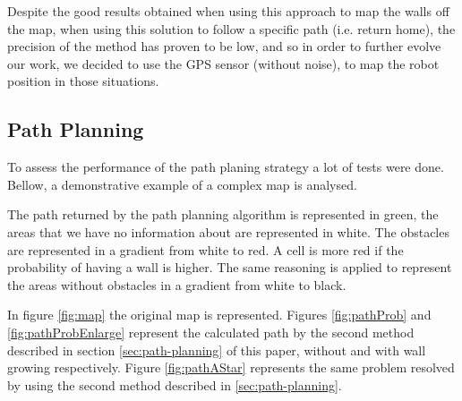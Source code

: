 \documentclass[oribibl]{llncs}
\begin{document}
Despite the good results obtained when using this approach to map the walls off the map, when using this solution to follow a specific path (i.e. return home), the precision of the method has proven to be low, and so in order to further evolve our work, we decided to use the GPS sensor (without noise), to map the robot position in  those situations.

\subsection{Path Planning}
To assess the performance of the path planing strategy a lot of tests were done. Bellow, a demonstrative example of a complex map is analysed. 

The path returned by the path planning algorithm is represented in green, the areas that we have no information about are represented in white. The obstacles are represented in a gradient from white to red. A cell is more red if the probability of having a wall is higher. The same reasoning is applied to represent the areas without obstacles in a gradient from white to black.

In figure \ref{fig:map} the original map is represented. Figures \ref{fig:pathProb} and  \ref{fig:pathProbEnlarge} represent the calculated path by the second method described in section \ref{sec:path-planning} of this paper, without and with wall growing respectively. Figure \ref{fig:pathAStar} represents the same problem resolved by using the second method described in \ref{sec:path-planning}.
\end{document}
